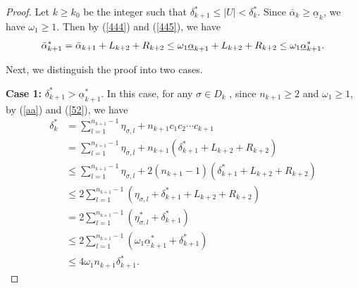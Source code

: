 \documentclass[reqno]{amsart}
\theoremstyle{plain}
\theoremstyle{definition}
\theoremstyle{remark}
\numberwithin{equation}{section} \DeclareMathOperator\intr{int}
\begin{document}
\begin{proof}
Let $k\ge k_0$ be the integer such that $\delta^*_{k+1}\le \left | U \right | <\delta^*_k$. Since $\bar{\alpha}_{k}\ge \underline{\alpha}_{k}$, we have $\omega_1\ge 1$. Then by (\ref{444}) and (\ref{445}), we have
\begin{equation}\label{52}
\bar\alpha^*_{k+1}=\bar\alpha_{k+1}+L_{k+2}+R_{k+2}\\
\le \omega_1\underline\alpha_{k+1}+L_{k+2}+R_{k+2}\le \omega _1\underline\alpha^*_{k+1}.
\end{equation}

Next, we distinguish the proof into two cases.

\textbf{Case 1:} $\delta^*_{k+1}>\underline\alpha^*_{k+1}$.
In this case, for any $\sigma \in D_k$ , since $n_{k+1}\ge 2$ and $\omega_1\ge 1$, by (\ref{aa}) and (\ref{52}), we have
\begin{equation}\label{53}
\begin{aligned}
 \delta^*_k&=\sum_{l=1}^{n_{k+1}-1} \eta_{\sigma,l}+n_{k+1}c_1c_2\cdots c_{k+1}\\
&=\sum_{l=1}^{n_{k+1}-1} \eta_{\sigma,l}+n_{k+1}(\delta^*_{k+1}+L_{k+2}+R_{k+2})\\
&\le \sum_{l=1}^{n_{k+1}-1} \eta_{\sigma,l}+2(n_{k+1}-1)(\delta^*_{k+1}+L_{k+2}+R_{k+2})\\
&\le 2\sum_{l=1}^{n_{k+1}-1}(\eta_{\sigma,l}+\delta^*_{k+1}+L_{k+2}+R_{k+2})\\
&= 2\sum_{l=1}^{n_{k+1}-1}(\eta^*_{\sigma,l}+\delta^*_{k+1})\\
&\le 2\sum_{l=1}^{n_{k+1}-1}(\omega_1\underline{\alpha}^*_{k+1} +\delta^*_{k+1})\\
&\le 4 \omega_1n_{k+1}\delta^*_{k+1}.
\end{aligned}
\end{equation}


\end{proof}
\end{document}
